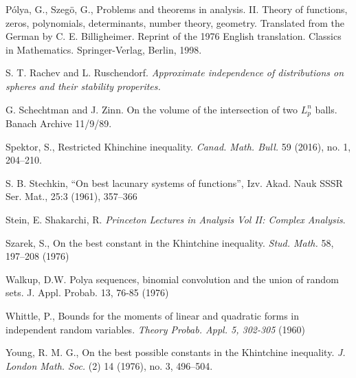 \documentclass[10pt]{article}
\newcommand{\1}{\textbf{1}}
\theoremstyle{remark}
\theoremstyle{definition}
\begin{document}
\begin{thebibliography}{9}
P\'olya, G., Szeg\"o, G., 
Problems and theorems in analysis. II. Theory of functions, zeros, polynomials, determinants, number theory, geometry. Translated from the German by C. E. Billigheimer. Reprint of the 1976 English translation. Classics in Mathematics. Springer-Verlag, Berlin, 1998.

 S. T. Rachev and L. Ruschendorf. \textit{Approximate independence of distributions on spheres and their stability properites.}


 G. Schechtman and J. Zinn. On the volume of the intersection of two $L_p^n$ balls. Banach Archive 11/9/89.

 Spektor, S.,
Restricted Khinchine inequality. 
\emph{Canad. Math. Bull.} 59 (2016), no. 1, 204--210.

 	S. B. Stechkin, “On best lacunary systems of functions”, Izv. Akad. Nauk SSSR Ser. Mat., 25:3 (1961), 357–366

 Stein, E. Shakarchi, R. \textit{Princeton Lectures in Analysis Vol II: Complex Analysis}. 

 Szarek, S.,
On the best constant in the Khintchine inequality.
\emph{Stud. Math.} 58, 197--208 (1976)


 Walkup, D.W. Polya sequences, binomial convolution and the union of random sets. J. Appl. Probab. 13, 76-85 (1976)

 Whittle, P., Bounds for the moments of linear and quadratic forms in independent random variables. \textit{Theory Probab. Appl. 5, 302-305} (1960)

 Young, R. M. G., On the best possible constants in the Khintchine inequality. \emph{J. London Math. Soc.} (2) 14 (1976), no. 3, 496--504.

\end{thebibliography}
\end{document}
